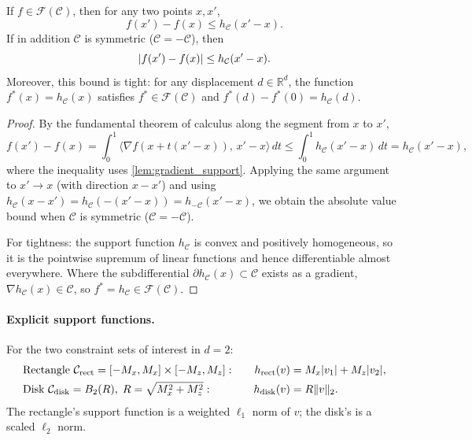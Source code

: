 \begin{lemma}\label{lem:lipschitz}
	If $f \in \mathcal{F}(\mathcal{C})$, then for any two points $x, x'$,
	\begin{equation}\label{eq:lipschitz_onesided}
		f(x') - f(x) \leq h_{\mathcal{C}}(x' - x).
	\end{equation}
	If in addition $\mathcal{C}$ is symmetric ($\mathcal{C} = -\mathcal{C}$), then
	\begin{equation}\label{eq:lipschitz}
		\lvert f(x') - f(x)\rvert \leq h_{\mathcal{C}}(x' - x).
	\end{equation}
	Moreover, this bound is tight: for any displacement $d \in \mathbb{R}^d$, the function $f^*(x) = h_{\mathcal{C}}(x)$ satisfies $f^* \in \mathcal{F}(\mathcal{C})$ and $f^*(d) - f^*(0) = h_{\mathcal{C}}(d)$.
\end{lemma}

\begin{proof}
	By the fundamental theorem of calculus along the segment from $x$ to $x'$,
	\begin{equation*}
		f(x') - f(x) = \int_0^1 \langle \nabla f(x + t(x'-x)),\, x' - x \rangle \, dt \leq \int_0^1 h_{\mathcal{C}}(x' - x) \, dt = h_{\mathcal{C}}(x' - x),
	\end{equation*}
	where the inequality uses \cref{lem:gradient_support}.
	Applying the same argument to $x' \to x$ (with direction $x - x'$) and using $h_{\mathcal{C}}(x - x') = h_{\mathcal{C}}(-(x'-x)) = h_{-\mathcal{C}}(x'-x)$, we obtain the absolute value bound when $\mathcal{C}$ is symmetric ($\mathcal{C} = -\mathcal{C}$).

	For tightness: the support function $h_{\mathcal{C}}$ is convex and positively homogeneous, so it is the pointwise supremum of linear functions and hence differentiable almost everywhere.
	Where the subdifferential $\partial h_{\mathcal{C}}(x) \subset \mathcal{C}$ exists as a gradient, $\nabla h_{\mathcal{C}}(x) \in \mathcal{C}$, so $f^* = h_{\mathcal{C}} \in \mathcal{F}(\mathcal{C})$.
\end{proof}

\paragraph{Explicit support functions.}
For the two constraint sets of interest in $d = 2$:
\begin{alignat*}{2}
	&\text{Rectangle } \mathcal{C}_{\mathrm{rect}} = [-M_x, M_x] \times [-M_z, M_z]: &\quad h_{\mathrm{rect}}(v) &= M_x \lvert v_1\rvert + M_z \lvert v_2\rvert, \\
	&\text{Disk } \mathcal{C}_{\mathrm{disk}} = B_2(R),\; R = \sqrt{M_x^2 + M_z^2}: &\quad h_{\mathrm{disk}}(v) &= R \lVert v\rVert_2.
\end{alignat*}
The rectangle's support function is a weighted $\ell_1$ norm of $v$; the disk's is a scaled $\ell_2$ norm.


